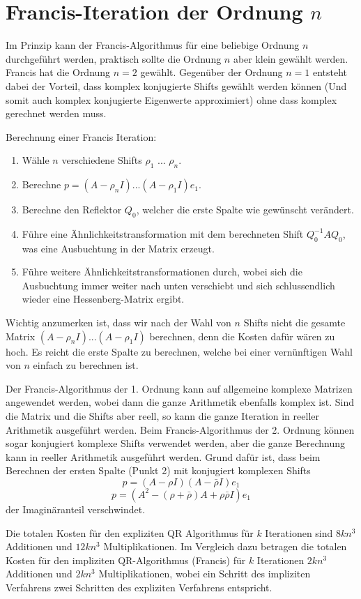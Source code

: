 \section{Francis-Iteration der Ordnung $n$}

Im Prinzip kann der Francis-Algorithmus für eine beliebige Ordnung $n$ durchgeführt werden, praktisch sollte die Ordnung $n$ aber klein gewählt werden.
Francis hat die Ordnung $n=2$ gewählt.
Gegenüber der Ordnung $n=1$ entsteht dabei der Vorteil, dass komplex konjugierte Shifts gewählt werden können (Und somit auch komplex konjugierte Eigenwerte approximiert) ohne dass komplex gerechnet werden muss.

Berechnung einer Francis Iteration:
\begin{enumerate}
	\item Wähle $n$ verschiedene Shifts $\rho_{1}$ ... $\rho_{n}$.
	\item Berechne $p= (A - \rho_{n}I) ... (A - \rho_{1}I)e_{1}$.
	\item Berechne den Reflektor $Q_{0}$, welcher die erste Spalte wie gewünscht verändert.
	\item Führe eine Ähnlichkeitstransformation mit dem berechneten Shift $Q_{0}^{-1}AQ_{0}$, was eine Ausbuchtung in der Matrix erzeugt.
	\item Führe weitere Ähnlichkeitstransformationen durch, wobei sich die Ausbuchtung immer weiter nach unten verschiebt und sich schlussendlich wieder eine Hessenberg-Matrix ergibt.
\end{enumerate}

Wichtig anzumerken ist, dass wir nach der Wahl von $n$ Shifts nicht die gesamte Matrix $(A - \rho_{n}I) ... (A - \rho_{1}I)$ berechnen, denn die Kosten dafür wären zu hoch. Es reicht die erste Spalte zu berechnen, welche bei einer vernünftigen Wahl von $n$ einfach zu berechnen ist.

Der Francis-Algorithmus der 1. Ordnung kann auf allgemeine komplexe Matrizen angewendet werden, wobei dann die ganze Arithmetik ebenfalls komplex ist.
Sind die Matrix und die Shifts aber reell, so kann die ganze Iteration in reeller Arithmetik ausgeführt werden.
Beim Francis-Algorithmus der 2. Ordnung können sogar konjugiert komplexe Shifts verwendet werden, aber die ganze Berechnung kann in reeller Arithmetik ausgeführt werden. Grund dafür ist, dass beim Berechnen der ersten Spalte (Punkt 2) mit konjugiert komplexen Shifts
\begin{equation}
p= (A - \rho I)(A - \bar{\rho} I)e_{1}
\end{equation}
\begin{equation}
p= (A^2-(\rho+\bar{\rho})A+\rho\bar{\rho}I)e_{1}
\end{equation}
der Imaginäranteil verschwindet.

Die totalen Kosten für den expliziten QR Algorithmus für $k$ Iterationen sind $8kn^{3}$ Additionen und $12kn^{3}$ Multiplikationen.
Im Vergleich dazu betragen die totalen Kosten für den impliziten QR-Algorithmus (Francis) für $k$ Iterationen $2kn^{3}$ Additionen und $2kn^{3}$ Multiplikationen, wobei ein Schritt des impliziten Verfahrens zwei Schritten des expliziten Verfahrens entspricht. \cite{francis:EthSeminar}
